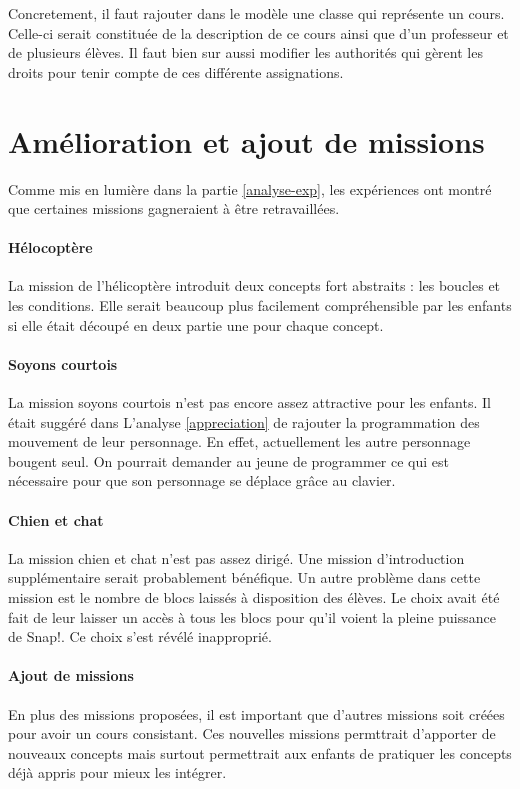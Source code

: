 Concretement, il faut rajouter dans le modèle une classe qui représente un cours. Celle-ci serait constituée de la description de ce cours ainsi que d'un professeur et de plusieurs élèves. Il faut bien sur aussi modifier les authorités qui gèrent les droits pour tenir compte de ces différente assignations.

\section{Amélioration et ajout de missions}
Comme mis en lumière dans la partie \ref{analyse-exp}, les expériences ont montré que certaines missions gagneraient à être retravaillées.

\paragraph{Hélocoptère}
La mission de l'hélicoptère introduit deux concepts fort abstraits : les boucles et les conditions. Elle serait beaucoup plus facilement compréhensible par les enfants si elle était découpé en deux partie une pour chaque concept.

\paragraph{Soyons courtois}
La mission soyons courtois n'est pas encore assez attractive pour les enfants. Il était suggéré dans L'analyse \ref{appreciation} de rajouter la programmation des mouvement de leur personnage. En effet, actuellement les autre personnage bougent seul. On pourrait demander au jeune de programmer ce qui est nécessaire pour que son personnage se déplace grâce au clavier. %

\paragraph{Chien et chat}
La mission chien et chat n'est pas assez dirigé. Une mission d'introduction supplémentaire serait probablement bénéfique. Un autre problème dans cette mission est le nombre de blocs laissés à disposition des élèves. Le choix avait été fait de leur laisser un accès à tous les blocs pour qu'il voient la pleine puissance de Snap!. Ce choix s'est révélé inapproprié.

\paragraph{Ajout de missions}
En plus des missions proposées, il est important que d'autres missions soit créées pour avoir un cours consistant. Ces nouvelles missions permttrait d'apporter de nouveaux concepts mais surtout permettrait aux enfants de pratiquer les concepts déjà appris pour mieux les intégrer.

